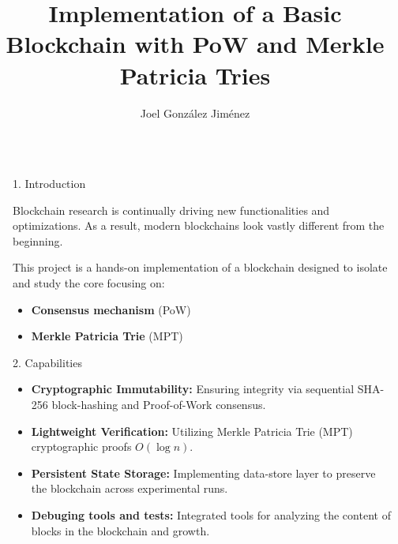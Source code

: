 \documentclass[final]{beamer}
\title{Implementation of a Basic Blockchain with PoW and Merkle Patricia Tries}
\author{Joel González Jiménez}
\institute[shortinst]{Master in Innovation and Research in Informatics (MIRI) | Computer Networks \& Distributed Systems }
\newlength{\sepwidth}
\newlength{\colwidth}
\newcommand{\separatorcolumn}{\begin{column}{\sepwidth}\end{column}}
\begin{document}
\begin{frame}[t]
\begin{columns}[t]
\separatorcolumn

\begin{column}{\colwidth}

	\vspace{-1em}
  \begin{block}{\LARGE 1. Introduction}
  	
    Blockchain research is continually driving new functionalities and optimizations. As a result, modern blockchains look vastly different from the beginning. 
    
    This project is a hands-on implementation of a blockchain designed to isolate and study the core focusing on:
    
    \begin{itemize}
    	\item \textbf{Consensus mechanism} (PoW)
    	\item \textbf{Merkle Patricia Trie} (MPT)
    \end{itemize}
    
  \end{block}
  \vspace{-1em}
  \begin{block}{\LARGE 2. Capabilities}
  	

	\begin{itemize}
		\item \textbf{Cryptographic Immutability:} Ensuring integrity via sequential SHA-256 block-hashing and Proof-of-Work consensus.
		\item \textbf{Lightweight Verification:} Utilizing Merkle Patricia Trie (MPT) cryptographic proofs $O(\log n)$.
		\item \textbf{Persistent State Storage:} Implementing data-store layer to preserve the blockchain across experimental runs.
		\item \textbf{Debuging tools and tests:} Integrated tools for analyzing the content of blocks in the blockchain and growth.
	\end{itemize}


\end{block}
\end{column}
\end{columns}
\end{frame}
\end{document}
